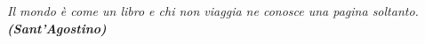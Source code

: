 \begin{titlepage}

\nonumber
\null {}
	\begin{flushright}

	\textit{Il mondo è come un libro e chi non viaggia ne conosce una pagina soltanto.} \\
	\textit{\textbf{(Sant'Agostino)}}
	\end{flushright}



\end{titlepage}